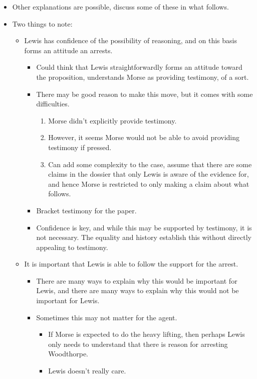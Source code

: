 \documentclass[10pt]{article}
\begin{document}
\begin{itemize}
\item Other explanations are possible, discuss some of these in what follows.
\item Two things to note:
  \begin{itemize}
  \item Lewis has confidence of the possibility of reasoning, and on this basis forms an attitude an arrests.
    \begin{itemize}
    \item Could think that Lewis straightforwardly forms an attitude toward the proposition, understands Morse as providing testimony, of a sort.
    \item There may be good reason to make this move, but it comes with some difficulties.
      \begin{enumerate}
      \item Morse didn't explicitly provide testimony.
      \item However, it seems Morse would not be able to avoid providing testimony if pressed.
      \item Can add some complexity to the case, assume that there are some claims in the dossier that only Lewis is aware of the evidence for, and hence Morse is restricted to only making a claim about what follows.
      \end{enumerate}
    \item Bracket testimony for the paper.
    \item Confidence is key, and while this may be supported by testimony, it is not necessary.
      The equality and history establish this without directly appealing to testimony.
    \end{itemize}
  \item It is important that Lewis is able to follow the support for the arrest.
    \begin{itemize}
    \item There are many ways to explain why this would be important for Lewis, and there are many ways to explain why this would not be important for Lewis.
    \item Sometimes this may not matter for the agent.
      \begin{itemize}
      \item If Morse is expected to do the heavy lifting, then perhaps Lewis only needs to understand that there is reason for arresting Woodthorpe.
      \item Lewis doesn't really care.

\end{itemize}
\end{itemize}
\end{itemize}
\end{itemize}
\end{document}
